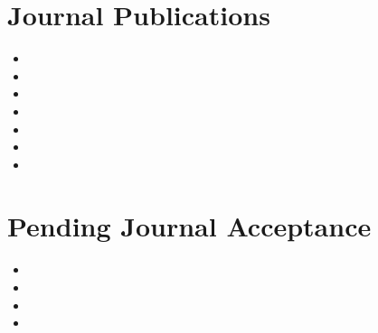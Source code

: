 \section{Journal Publications}

\begin{itemize}[noitemsep,topsep=0pt]

    \item {}
    \item {}

    \item {}
    \item {}
    \item {}
    \item {}
    \item {}

\end{itemize}

\section{Pending Journal Acceptance}

\begin{itemize}[noitemsep,topsep=0pt]

    \item {}

    \item {}
    \item {}
    \item {}

\end{itemize}
